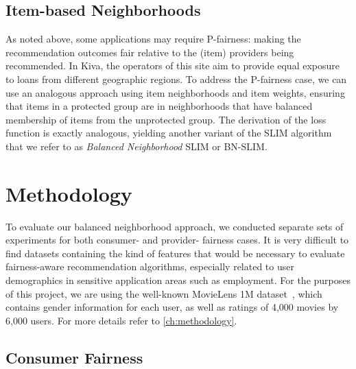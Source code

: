 \subsection{Item-based Neighborhoods}

As noted above, some applications may require P-fairness: making the recommendation outcomes fair relative to the (item) providers being recommended.  In Kiva, the operators of this site aim to provide equal exposure to loans from different geographic regions. To address the P-fairness case, we can use an analogous approach using item neighborhoods and item weights, ensuring that items in a protected group are in neighborhoods that have balanced membership of items from the unprotected group. The derivation of the loss function is exactly analogous, yielding another variant of the SLIM algorithm that we refer to as \textit{Balanced Neighborhood} SLIM or BN-SLIM.

\section{Methodology}

To evaluate our balanced neighborhood approach, we conducted separate sets of experiments for both consumer- and provider- fairness cases. It is very difficult to find datasets containing the kind of features that would be necessary to evaluate fairness-aware recommendation algorithms, especially related to user demographics in sensitive application areas such as employment. For the purposes of this project, we are using the well-known MovieLens 1M dataset~\cite{movielens}, which contains gender information for each user, as well as ratings of 4,000 movies by 6,000 users. For more details refer to \ref{ch:methodology}.


\subsection{Consumer Fairness}

